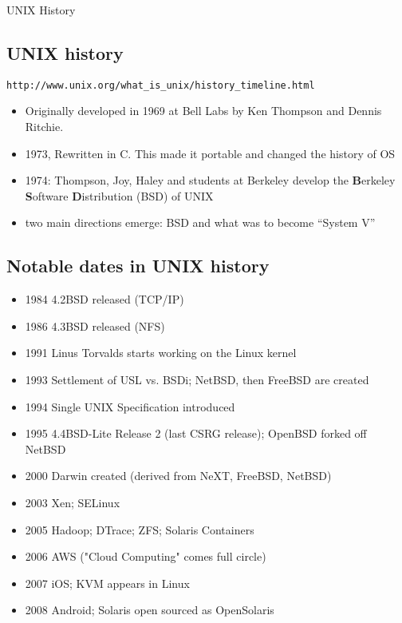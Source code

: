 \documentclass[sxga]{xdvislides}
\begin{document}
\pagebreak

\vspace*{\fill}
\begin{center}
  \Hugesize
    UNIX History
	\hspace*{5mm}\blueline\\ [1em]
  \Normalsize
\end{center}
\vspace*{\fill}

\subsection{UNIX history}
\verb+http://www.unix.org/what_is_unix/history_timeline.html+ \\

\begin{itemize}
	\item Originally developed in 1969 at Bell Labs by Ken Thompson
		and Dennis Ritchie.
	\item 1973, Rewritten in C. This made it portable and changed the history of OS
	\item 1974: Thompson, Joy, Haley and students at Berkeley develop
		the {\bf B}erkeley {\bf S}oftware {\bf D}istribution (BSD) of UNIX
	\item two main directions emerge: BSD and what was to become ``System V''
\end{itemize}

\subsection{Notable dates in UNIX history}
\begin{itemize}
	\item 1984 4.2BSD released (TCP/IP)
	\item 1986 4.3BSD released (NFS)
	\item 1991 Linus Torvalds starts working on the Linux kernel
	\item 1993 Settlement of USL vs. BSDi; NetBSD, then FreeBSD are created
	\item 1994 Single UNIX Specification introduced
	\item 1995 4.4BSD-Lite Release 2 (last CSRG release); OpenBSD
		forked off NetBSD
	\item 2000 Darwin created (derived from NeXT, FreeBSD, NetBSD)
	\item 2003 Xen; SELinux
	\item 2005 Hadoop; DTrace; ZFS; Solaris Containers
	\item 2006 AWS ("Cloud Computing" comes full circle)
	\item 2007 iOS; KVM appears in Linux
	\item 2008 Android; Solaris open sourced as OpenSolaris
\end{itemize}
\end{document}

